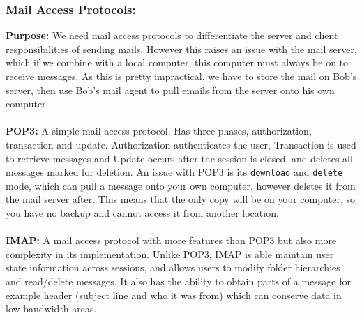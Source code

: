 \documentclass[]{article}
\begin{document}
\subsubsection{Mail Access Protocols:}
\textcolor{Emerald}{\textbf{Purpose:}} We need mail access protocols to differentiate the server and client responsibilities of sending mails. However this raises an issue with the mail server, which if we combine with a local computer, this computer must always be on to receive messages. As this is pretty impractical, we have to store the mail on Bob's server, then use Bob's mail agent to pull emails from the server onto his own computer. \\\\
\textcolor{Emerald}{\textbf{POP3:}} A simple mail access protocol. Has three phases, authorization, transaction and update. Authorization authenticates the user, Transaction is used to retrieve messages and Update occurs after the session is closed, and deletes all messages marked for deletion. An issue with POP3 is its \texttt{download} and \texttt{delete} mode, which can pull a message onto your own computer, however deletes it from the mail server after. This means that the only copy will be on your computer, so you have no backup and cannot access it from another location. \\\\
\textcolor{Emerald}{\textbf{IMAP:}} A mail access protocol with more features than POP3 but also more complexity in its implementation. Unlike POP3, IMAP is able maintain user state information across sessions, and allows users to modify folder hierarchies and read/delete messages. It also has the ability to obtain parts of a message for example header (subject line and who it was from) which can conserve data in low-bandwidth areas.
\newpage 
\end{document}
